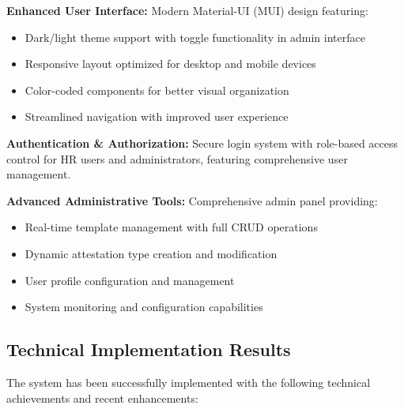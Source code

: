 \documentclass[a4paper,12pt]{report}
\begin{document}
\begin{doublespace}
\textbf{Enhanced User Interface:} Modern Material-UI (MUI) design featuring:
\begin{itemize}
    \item Dark/light theme support with toggle functionality in admin interface
    \item Responsive layout optimized for desktop and mobile devices
    \item Color-coded components for better visual organization
    \item Streamlined navigation with improved user experience
\end{itemize}

\textbf{Authentication \& Authorization:} Secure login system with role-based access control for HR users and administrators, featuring comprehensive user management.

\textbf{Advanced Administrative Tools:} Comprehensive admin panel providing:
\begin{itemize}
    \item Real-time template management with full CRUD operations
    \item Dynamic attestation type creation and modification
    \item User profile configuration and management
    \item System monitoring and configuration capabilities
\end{itemize}

\subsection{Technical Implementation Results}
\hspace{1cm}The system has been successfully implemented with the following technical achievements and recent enhancements:


\end{doublespace}
\end{document}

